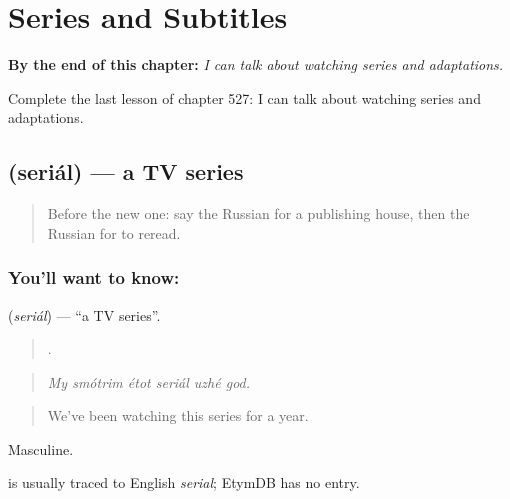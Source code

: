 
\chapter{Series and Subtitles}
\label{ch:ru-series-and-subtitles}

\begin{chapteropening}
\textbf{By the end of this chapter:} \emph{I can talk about watching series and adaptations.}

Complete the last lesson of chapter 527: I can talk about watching series and adaptations.
\end{chapteropening}

\section[\texorpdfstring{\ru{сериал} (seriál)}{сериал (seriál)}]{ (seriál) — a TV series}

\label{lesson:RU-C527-serial}



\begin{quote}
Before the new one: say the Russian for a publishing house, then the Russian for to reread.
\end{quote}

\subsection*{You'll want to know: }
\textbf{} (\emph{seriál}) — \textquotedblleft{}a TV series\textquotedblright{}.

\begin{quote}
     .
\end{quote}

\begin{quote}
\emph{My smótrim étot seriál uzhé god.}
\end{quote}

\begin{quote}
We've been watching this series for a year.
\end{quote}

Masculine.

\begin{cousinweb}
\emph{} is usually traced to English \emph{serial}; EtymDB has no entry.
\end{cousinweb}

